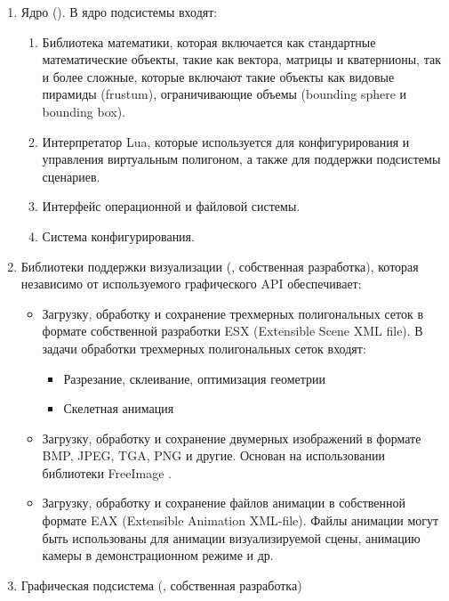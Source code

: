 \begin{enumerate}
	\item	Ядро (). В ядро подсистемы входят:
	\begin{enumerate}
		\item	Библиотека математики, которая включается как стандартные математические объекты, 
				такие как вектора, матрицы и кватернионы, так и более сложные, которые включают 
				такие объекты как видовые пирамиды (frustum), ограничивающие объемы (bounding sphere и bounding box).
		\item	Интерпретатор Lua, которые используется для конфигурирования 
				и управления виртуальным полигоном, 
				а также для поддержки подсистемы сценариев.
		\item 	Интерфейс операционной и файловой системы.
		\item	Система конфигурирования.
	\end{enumerate}
	\item 	Библиотеки поддержки визуализации (, собственная разработка), 
			которая независимо от используемого графического API обеспечивает:
			\begin{itemize}
			\item	Загрузку, обработку и сохранение трехмерных полигональных сеток в 
					формате собственной разработки ESX (Extensible Scene XML file). 
					В задачи обработки трехмерных полигональных сеток входят:
					\begin{itemize}
					\item	Разрезание, склеивание, оптимизация геометрии
					\item	Скелетная анимация
					\end{itemize}
			\item	Загрузку, обработку и сохранение двумерных изображений 
					в формате BMP, JPEG, TGA, PNG и другие. 
					Основан на использовании библиотеки FreeImage \citep{freeimage}.
			\item	Загрузку, обработку и сохранение файлов анимации в собственной формате 
					EAX (Extensible Animation XML-file). Файлы анимации могут быть использованы 
					для анимации визуализируемой сцены, анимацию камеры в демонстрационном режиме и др.
			\end{itemize}
	\item	Графическая подсистема (, собственная разработка) 

\end{enumerate}
